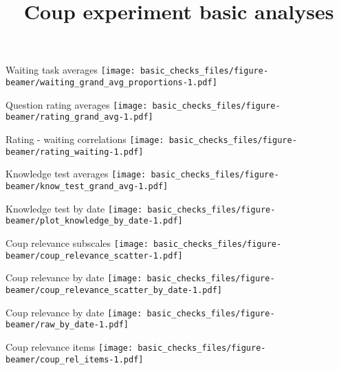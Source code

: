 \documentclass[
  ignorenonframetext,
]{beamer}
\title{Coup experiment basic analyses}
\author{}
\date{\vspace{-2.5em}}
\begin{document}
\frame{\titlepage}

\begin{frame}{Waiting task averages}
\protect\hypertarget{waiting-task-averages}{}
\texttt{[image: basic\_checks\_files/figure-beamer/waiting\_grand\_avg\_proportions-1.pdf]}
\end{frame}

\begin{frame}{Question rating averages}
\protect\hypertarget{question-rating-averages}{}
\texttt{[image: basic\_checks\_files/figure-beamer/rating\_grand\_avg-1.pdf]}
\end{frame}

\begin{frame}{Rating - waiting correlations}
\protect\hypertarget{rating---waiting-correlations}{}
\texttt{[image: basic\_checks\_files/figure-beamer/rating\_waiting-1.pdf]}
\end{frame}

\begin{frame}{Knowledge test averages}
\protect\hypertarget{knowledge-test-averages}{}
\texttt{[image: basic\_checks\_files/figure-beamer/know\_test\_grand\_avg-1.pdf]}
\end{frame}

\begin{frame}{Knowledge test by date}
\protect\hypertarget{knowledge-test-by-date}{}
\texttt{[image: basic\_checks\_files/figure-beamer/plot\_knowledge\_by\_date-1.pdf]}
\end{frame}

\begin{frame}{Coup relevance subscales}
\protect\hypertarget{coup-relevance-subscales}{}
\texttt{[image: basic\_checks\_files/figure-beamer/coup\_relevance\_scatter-1.pdf]}
\end{frame}

\begin{frame}{Coup relevance by date}
\protect\hypertarget{coup-relevance-by-date}{}
\texttt{[image: basic\_checks\_files/figure-beamer/coup\_relevance\_scatter\_by\_date-1.pdf]}
\end{frame}

\begin{frame}{Coup relevance by date}
\protect\hypertarget{coup-relevance-by-date-1}{}
\texttt{[image: basic\_checks\_files/figure-beamer/raw\_by\_date-1.pdf]}
\end{frame}

\begin{frame}{Coup relevance items}
\protect\hypertarget{coup-relevance-items}{}
\texttt{[image: basic\_checks\_files/figure-beamer/coup\_rel\_items-1.pdf]}
\end{frame}
\end{document}
